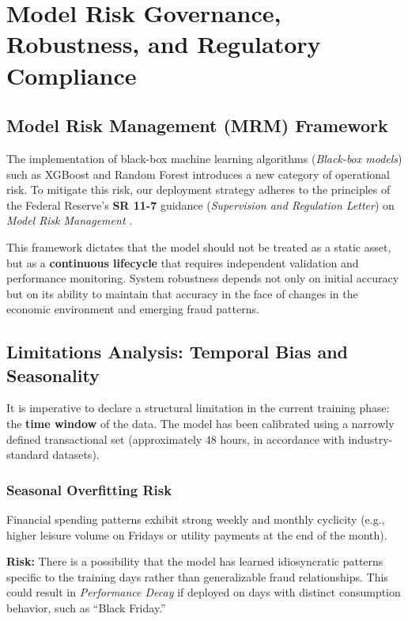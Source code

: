 \documentclass[12pt,a4paper]{report}
\begin{document}
\chapter{Model Risk Governance, Robustness, and Regulatory Compliance}

\section{Model Risk Management (MRM) Framework}

The implementation of black-box machine learning algorithms (\textit{Black-box models}) such as XGBoost and Random Forest introduces a new category of operational risk. To mitigate this risk, our deployment strategy adheres to the principles of the Federal Reserve’s \textbf{SR 11-7} guidance (\textit{Supervision and Regulation Letter}) on \textit{Model Risk Management} \cite{fed2011}.

This framework dictates that the model should not be treated as a static asset, but as a \textbf{continuous lifecycle} that requires independent validation and performance monitoring. System robustness depends not only on initial accuracy but on its ability to maintain that accuracy in the face of changes in the economic environment and emerging fraud patterns.

\section{Limitations Analysis: Temporal Bias and Seasonality}

It is imperative to declare a structural limitation in the current training phase: the \textbf{time window} of the data. The model has been calibrated using a narrowly defined transactional set (approximately 48 hours, in accordance with industry-standard datasets).

\subsection{Seasonal Overfitting Risk}

Financial spending patterns exhibit strong weekly and monthly cyclicity (e.g., higher leisure volume on Fridays or utility payments at the end of the month).

\textbf{Risk:} There is a possibility that the model has learned idiosyncratic patterns specific to the training days rather than generalizable fraud relationships. This could result in \textit{Performance Decay} if deployed on days with distinct consumption behavior, such as \textquotedblleft Black Friday.\textquotedblright
\end{document}
